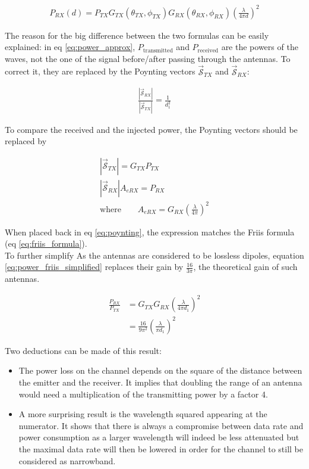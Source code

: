 \documentclass[10pt,a4paper]{ULBreport}
\begin{document}
\begin{align}
    P_{RX}(d) = P_{TX} G_{TX}(\theta_{TX}, \phi_{TX})G_{RX}(\theta_{RX}, \phi_{RX})\left(\frac{\lambda}{4\pi d}\right)^2
    \label{eq:friis_formula}
\end{align}

The reason for the big difference between the two formulas can be easily explained: in eq \ref{eq:power_approx}, $P_{\text{transmitted}}$ and $P_{\text{received}}$ are the powers of the waves, not the one of the signal before/after passing through the antennas. To correct it, they are replaced by the Poynting vectors $\bm{\vec{\mathscr{S}}}_{TX}$ and $\bm{\vec{\mathscr{S}}}_{RX}$:

\begin{align}
    \frac{\left|\bm{\vec{\mathscr{S}}}_{RX}\right|}{\left|\bm{\vec{\mathscr{S}}}_{TX}\right|} = \frac{1}{d_1^2}
    \label{eq:poynting}
\end{align}

To compare the received and the injected power, the Poynting vectors should be replaced by

\begin{align*}
    \left|\bm{\vec{\mathscr{S}}}_{TX}\right| = G_{TX} P_{TX}\\
    \left|\bm{\vec{\mathscr{S}}}_{RX}\right| A_{eRX} = P_{RX}\\
    \text{where} \quad \quad A_{eRX} = G_{RX}\left(\frac{\lambda}{4\pi}\right)^2
\end{align*}

When placed back in eq \ref{eq:poynting}, the expression matches the Friis formula (eq \ref{eq:friis_formula}). \\
To further simplify As the antennas are considered to be lossless dipoles, equation \ref{eq:power_friis_simplified} replaces their gain by $\frac{16}{3\pi}$, the theoretical gain of such antennas.

\begin{align}
    \frac{P_{RX}}{P_{TX}} &= G_{TX} G_{RX} \left(\frac{\lambda}{4\pi d_1}\right)^2\\
    \label{eq:power_friis_simplified}
    &= \frac{16}{9\pi^2} \left(\frac{\lambda}{\pi d_1}\right)^2
\end{align}

Two deductions can be made of this result: 
\begin{itemize}
    \item The power loss on the channel depends on the square of the distance between the emitter and the receiver. It implies that doubling the range of an antenna would need a multiplication of the transmitting power by a factor 4.
    \item A more surprising result is the wavelength squared appearing at the numerator. It shows that there is always a compromise between data rate and power consumption as a larger wavelength will indeed be less attenuated but the maximal data rate will then be lowered in order for the channel to still be considered as narrowband.
\end{itemize}
\end{document}
